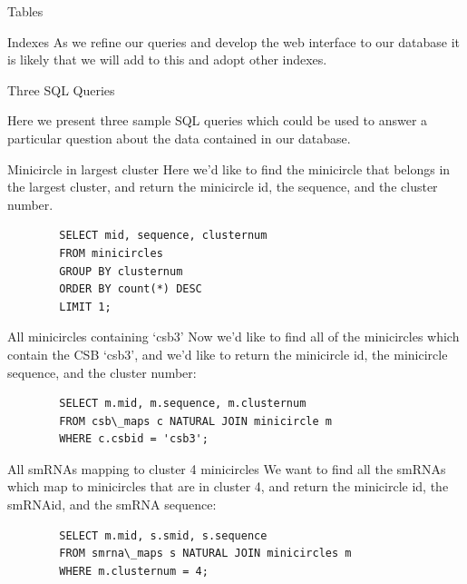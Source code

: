 \documentclass[a4paper,10pt,notitlepage]{article}
\begin{document}
\begin{section}{Tables}
\begin{subsection}{Indexes}
        As we refine our queries and develop the web interface to our database it is likely that we will add to this and adopt
        other indexes.

    \end{subsection}



\end{section}

\begin{section}{Three SQL Queries}

    Here we present three sample SQL queries which could be used to answer a particular question about the data contained in our
    database.

    \begin{subsection}{Minicircle in largest cluster}
        Here we'd like to find the minicircle that belongs in the largest cluster, and return the minicircle id, the sequence,
        and the cluster number.

        \begin{lstlisting}
        SELECT mid, sequence, clusternum
        FROM minicircles
        GROUP BY clusternum
        ORDER BY count(*) DESC
        LIMIT 1;
        \end{lstlisting}
    \end{subsection}

    \begin{subsection}{All minicircles containing `csb3'}
        Now we'd like to find all of the minicircles which contain the CSB `csb3', and we'd like to return the minicircle id, the 
        minicircle sequence, and the cluster number:

        \begin{lstlisting}
        SELECT m.mid, m.sequence, m.clusternum
        FROM csb\_maps c NATURAL JOIN minicircle m
        WHERE c.csbid = 'csb3';
        \end{lstlisting}
    \end{subsection}

    \begin{subsection}{All smRNAs mapping to cluster 4 minicircles}
        We want to find all the smRNAs which map to minicircles that are in cluster 4, and return the minicircle id, the smRNAid, 
        and the smRNA sequence:

        \begin{lstlisting}
        SELECT m.mid, s.smid, s.sequence
        FROM smrna\_maps s NATURAL JOIN minicircles m
        WHERE m.clusternum = 4;
        \end{lstlisting}

    \end{subsection}
\end{section}
\end{document}

